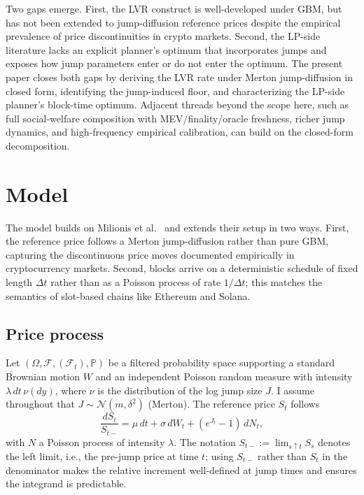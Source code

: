 \documentclass[runningheads]{llncs}
\newcommand{\Prob}{\mathbb{P}}
\newcommand{\dt}{\Delta t}
\newcommand{\1}{\mathbf{1}}
\begin{document}
Two gaps emerge. First, the LVR construct is well-developed under GBM, but has not been extended to jump-diffusion reference prices despite the empirical prevalence of price discontinuities in crypto markets. Second, the LP-side literature lacks an explicit planner's optimum that incorporates jumps and exposes how jump parameters enter or do not enter the optimum. The present paper closes both gaps by deriving the LVR rate under Merton jump-diffusion in closed form, identifying the jump-induced floor, and characterizing the LP-side planner's block-time optimum. Adjacent threads beyond the scope here, such as full social-welfare composition with MEV/finality/oracle freshness, richer jump dynamics, and high-frequency empirical calibration, can build on the closed-form decomposition.

\section{Model}\label{sec:model}

The model builds on Milionis et al.~\cite{milionis2022automated,milionis2023automated} and extends their setup in two ways. First, the reference price follows a Merton jump-diffusion rather than pure GBM, capturing the discontinuous price moves documented empirically in cryptocurrency markets. Second, blocks arrive on a deterministic schedule of fixed length $\dt$ rather than as a Poisson process of rate $1/\dt$; this matches the semantics of slot-based chains like Ethereum and Solana.

\subsection{Price process}
Let $(\Omega, \mathcal{F}, (\mathcal{F}_t), \Prob)$ be a filtered probability space supporting a standard Brownian motion $W$ and an independent Poisson random measure with intensity $\lambda \, dt \, \nu(dy)$, where $\nu$ is the distribution of the log jump size $J$. I assume throughout that $J \sim \mathcal{N}(m, \delta^2)$ (Merton). The reference price $S_t$ follows
\begin{equation}\label{eq:merton}
\frac{dS_t}{S_{t-}} = \mu\,dt + \sigma \, dW_t + (e^{J_t} - 1)\,dN_t,
\end{equation}
with $N$ a Poisson process of intensity $\lambda$. The notation $S_{t-} := \lim_{s\uparrow t} S_s$ denotes the left limit, i.e., the pre-jump price at time $t$; using $S_{t-}$ rather than $S_t$ in the denominator makes the relative increment well-defined at jump times and ensures the integrand is predictable.
\end{document}

